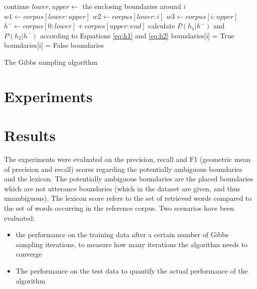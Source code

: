 \documentclass[11pt]{article}
\begin{document}
\begin{algorithm}
    \begin{algorithmic}
        \For{$i \in$ $[0, |corpus|)$}
            \State continue 
        \EndIf
        \State $lower, upper \gets $ the enclosing boundaries around $i$
        \State $w1 \gets corpus[lower:upper]$ 
        \State $w2 \gets corpus[lower:i]$
        \State $w3 \gets corpus[i:upper]$
        \State $h^{-} \gets corpus[0:lower] + corpus[upper:end]$ 
        \State
        \State calculate $P(h_1 | h^-)$ and $P(h_2 | h^-)$ according to
               Equations \ref{eq:h1} and \ref{eq:h2}
        \State
          \State boundaries[i] = True
        \Else
          \State boundaries[i] = False
        \EndIf
        \EndFor
        \Return boundaries
    \EndFunction
    \end{algorithmic}
    \caption{The Gibbs sampling algorithm}
    \label{algo:gibbs}
\end{algorithm}

\FloatBarrier
\section{Experiments}

\section{Results}
The experiments were evaluated on the precision, recall and F1 (geometric mean
of precision and recall) scores regarding the potentially ambiguous boundaries
and the lexicon. The potentially ambiguous boundaries are the placed boundaries
which are not utterance boundaries (which in the dataset are given, and thus
unambiguous). The lexicon score refers to the set of retrieved words compared to
the set of words occurring in the reference corpus. Two scenarios have been
evaluated:
\begin{itemize}
  \item the performance on the training data after a certain number of Gibbs
    sampling iterations, to measure how many iterations the algorithm needs to
    converge
  \item The performance on the test data to quantify the actual performance of
    the algorithm
\end{itemize}
\end{document}
